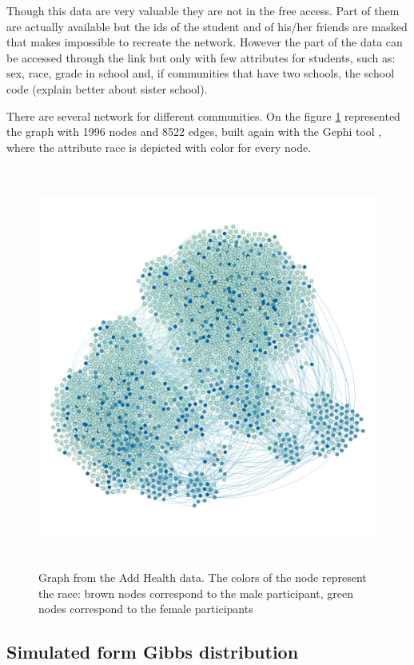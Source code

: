 \documentclass[12pt]{report}
\begin{document}
Though this data are very valuable they are not in the free access. Part of them are actually available but the ids of the student and of his/her friends are masked that makes impossible to recreate the network. However the part of the data can be accessed through the link \cite{Addhealth2} but only with few attributes for students, such as:  sex, race, grade in school and, if communities that have two schools, the school code (explain better about sister school). 

There are several network for different communities. 
On the figure \ref{fig:addhealthRace} represented the graph with 1996 nodes and 8522 edges, built again with the Gephi tool \cite{GEPHI}, where the attribute race is depicted with color for every node.
\begin{figure}[ht]
    \centering
    \includegraphics[height=500px]{addhealthRace}
    \caption{Graph from the Add Health data. The colors of the node represent the race: brown nodes correspond to the male participant, green nodes correspond to the female participants}
    \label{fig:addhealthRace}
\end{figure}


\subsection{Simulated form Gibbs distribution}
\end{document}
